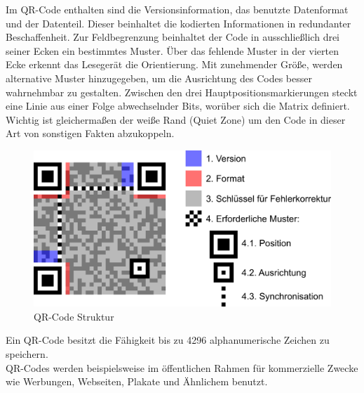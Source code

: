 \documentclass[12pt,					%
							 oneside,			%
							 a4paper,			%
							 halfparskip,		%
							 liststotoc,			%
							 bibtotoc,			%
							 fleqn,				%
							 pointlessnumbers]	%
							 {scrreprt}
\begin{document}
Im QR-Code enthalten sind die Versionsinformation, das benutzte Datenformat und der Datenteil. Dieser beinhaltet die kodierten Informationen in redundanter Beschaffenheit. Zur Feldbegrenzung beinhaltet der Code in ausschließlich drei seiner Ecken ein bestimmtes Muster. Über das fehlende Muster in der vierten Ecke erkennt das Lesegerät die Orientierung. Mit zunehmender Größe, werden alternative Muster hinzugegeben, um die Ausrichtung des Codes besser wahrnehmbar zu gestalten. Zwischen den drei Hauptpositionsmarkierungen steckt eine Linie aus einer Folge abwechselnder Bits, worüber sich die Matrix definiert. Wichtig ist gleichermaßen der weiße Rand (Quiet Zone) um den Code in dieser Art von sonstigen Fakten abzukoppeln. 
\begin{figure}[ht]
\centering   
	 \includegraphics[scale=0.12]{pictures/QRCodeBild} 
 	\caption{QR-Code Struktur \cite{qrexapmle}}
\end{figure}

Ein QR-Code besitzt die Fähigkeit bis zu 4296 alphanumerische Zeichen zu speichern.\\ 
QR-Codes werden beispielsweise im öffentlichen Rahmen für kommerzielle Zwecke wie Werbungen, Webseiten, Plakate und Ähnlichem benutzt.
\end{document}
